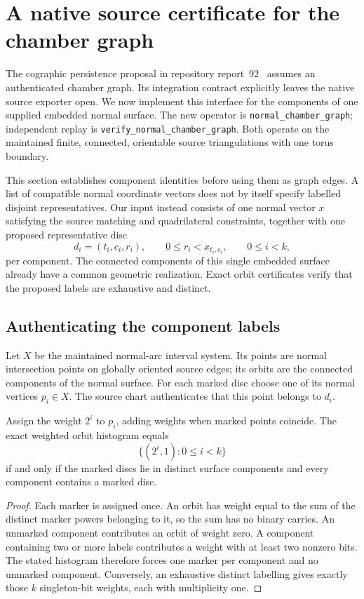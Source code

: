 \section{A native source certificate for the chamber graph}
\label{sec:chambers}

The cographic persistence proposal in repository report~92~\cite{persistence} assumes an
authenticated chamber graph. Its integration contract explicitly leaves the
native source exporter open. We now implement this interface for the
components of one supplied embedded normal surface. The new operator is
\texttt{normal\_chamber\_graph}; independent replay is
\texttt{verify\_normal\_chamber\_graph}. Both operate on the maintained finite,
connected, orientable source triangulations with one torus boundary.

This section establishes component identities before using them as graph
edges. A list of compatible normal coordinate vectors does not by itself
specify labelled disjoint representatives. Our input instead consists of one
normal vector $x$ satisfying the source matching and quadrilateral constraints,
together with one proposed representative disc
\[
 d_i=(t_i,c_i,r_i),\qquad 0\le r_i<x_{t_i,c_i},\qquad 0\le i<k,
\]
per component. The connected components of this single embedded surface
already have a common geometric realization. Exact orbit certificates verify
that the proposed labels are exhaustive and distinct.

\subsection{Authenticating the component labels}

Let $X$ be the maintained normal-arc interval system. Its points are normal
intersection points on globally oriented source edges; its orbits are the
connected components of the normal surface. For each marked disc choose one
of its normal vertices $p_i\in X$. The source chart authenticates that this
point belongs to $d_i$.

\begin{lemma}
\label{lem:component-marker-census}
Assign the weight $2^i$ to $p_i$, adding weights when marked points coincide.
The exact weighted orbit histogram equals
\[
 \bigl\{(2^i,1):0\le i<k\bigr\}
\]
if and only if the marked discs lie in distinct surface components and every
component contains a marked disc.
\end{lemma}
\begin{proof}
Each marker is assigned once. An orbit has weight equal to the sum of the
distinct marker powers belonging to it, so the sum has no binary carries.
An unmarked component contributes an orbit of weight zero. A component
containing two or more labels contributes a weight with at least two nonzero
bits. The stated histogram therefore forces one marker per component and no
unmarked component. Conversely, an exhaustive distinct labelling gives
exactly those $k$ singleton-bit weights, each with multiplicity one.
\end{proof}

